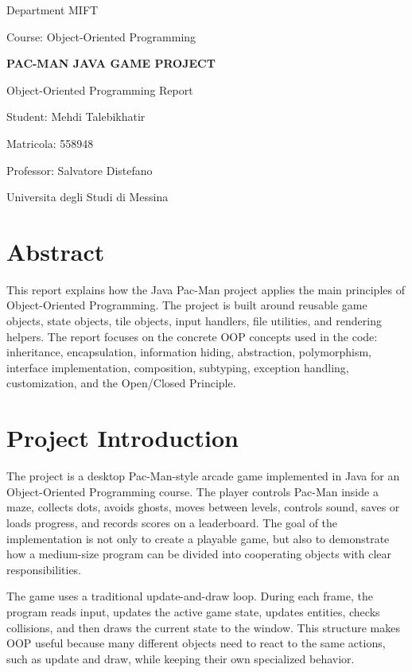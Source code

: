 \documentclass[12pt,a4paper]{article}
\begin{document}
\begin{titlepage}
\centering
{\large Department MIFT\par}
\vspace{0.4cm}
{\large Course: Object-Oriented Programming\par}
\vspace{1.5cm}
{\Huge\bfseries PAC-MAN JAVA GAME PROJECT\par}
\vspace{0.8cm}
{\Large Object-Oriented Programming Report\par}
\vfill
{\large Student: Mehdi Talebikhatir\par}
{\large Matricola: 558948\par}
\vspace{0.4cm}
{\large Professor: Salvatore Distefano\par}
{\large Universita degli Studi di Messina\par}
\vfill
\end{titlepage}
\tableofcontents
\newpage
\section*{Abstract}
This report explains how the Java Pac-Man project applies the main principles of Object-Oriented Programming. The project is built around reusable game objects, state objects, tile objects, input handlers, file utilities, and rendering helpers. The report focuses on the concrete OOP concepts used in the code: inheritance, encapsulation, information hiding, abstraction, polymorphism, interface implementation, composition, subtyping, exception handling, customization, and the Open/Closed Principle.


\section*{Project Introduction}
The project is a desktop Pac-Man-style arcade game implemented in Java for an Object-Oriented Programming course. The player controls Pac-Man inside a maze, collects dots, avoids ghosts, moves between levels, controls sound, saves or loads progress, and records scores on a leaderboard. The goal of the implementation is not only to create a playable game, but also to demonstrate how a medium-size program can be divided into cooperating objects with clear responsibilities.

The game uses a traditional update-and-draw loop. During each frame, the program reads input, updates the active game state, updates entities, checks collisions, and then draws the current state to the window. This structure makes OOP useful because many different objects need to react to the same actions, such as update and draw, while keeping their own specialized behavior.
\end{document}
